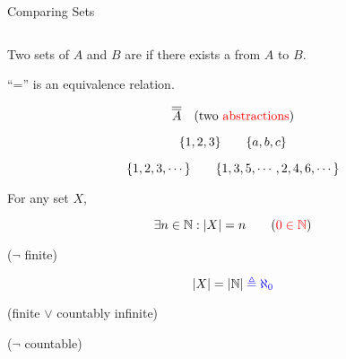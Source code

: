 \begin{frame}{}
  \centerline{\LARGE Comparing Sets}

  \vspace{0.30cm}
  \begin{columns}
  \end{columns}
\end{frame}

\begin{frame}{}
\end{frame}

\begin{frame}{}
  \begin{definition}[$|A| = |B|$ (1878)]
    Two sets of $A$ and $B$ are  if there exists a  from $A$ to $B$.
  \end{definition}

  \pause
  \vspace{0.60cm}
  \centerline{``='' is an equivalence relation.}

  \pause
  \[
    \overline{\overline{A}} \quad \text{(two \textcolor{red}{abstractions})}
  \]

  \pause
  \[
    \{1,2,3\} \qquad \{a,b,c\}
  \]

  \pause
  \[
    \{1,2,3,\cdots\} \qquad \{1,3,5,\cdots, 2,4,6,\cdots\}
  \]
\end{frame}

\begin{frame}{}
  \begin{definition}
    For any set $X$,
    \begin{description}
      \item[Finite] 
	\[
	  \exists n \in \mathbb{N}: |X| = n  \qquad (\textcolor{red}{0 \in \mathbb{N}})
	\]
      \item[Infinite] ($\lnot$ finite)
      \pause
      \item[Countably Infinite]
	\[
	  |X| = |\mathbb{N}| \textcolor{blue}{\;\triangleq \aleph_{0}}
	\]
      \item[Countable] (finite $\lor$ countably infinite)
      \item[Uncountably Infinite] ($\lnot$ countable)
    \end{description}
  \end{definition}
\end{frame}


